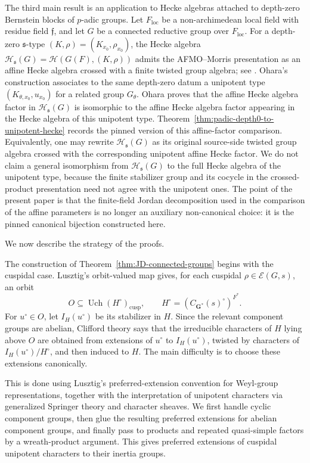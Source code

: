 \documentclass{amsart}
\theoremstyle{plain}
\numberwithin{equation}{section}
\theoremstyle{definition}
\newcommand{\cE}{\mathcal{E}}
\newcommand{\Uch}{\operatorname{Uch}}
\newcommand{\cusp}{\operatorname{cusp}}
\newcommand{\cH}{\mathcal{H}}
\newcommand{\bG}{\mathbf{G}}
\begin{document}
The third main result is an application to Hecke algebras attached to
depth-zero Bernstein blocks of \(p\)-adic groups.  Let \(F_{\mathrm{loc}}\) be
a non-archimedean local field with residue field \(\mathfrak f\), and let
\(G\) be a connected reductive group over \(F_{\mathrm{loc}}\).  For a depth-zero
\(\mathfrak s\)-type \((K,\rho)=(K_{x_0},\rho_{x_0})\), the Hecke algebra
\(\cH_{\mathfrak s}(G)=\mathcal H(G(F),(K,\rho))\) admits the AFMO--Morris
presentation as an affine Hecke algebra crossed with a finite twisted group
algebra; see \cite{AFMO24a}.  Ohara's construction \cite{ohara2025} associates
to the same depth-zero datum a unipotent type \((K_{\theta,x_0},u_{x_0})\) for a
related group \(G_\theta\).  Ohara proves that the affine Hecke algebra factor in
\(\cH_{\mathfrak s}(G)\) is isomorphic to the affine Hecke algebra factor
appearing in the Hecke algebra of this unipotent type.  Theorem~\ref{thm:padic-depth0-to-unipotent-hecke}
records the pinned version of this affine-factor comparison.  Equivalently, one
may rewrite \(\cH_{\mathfrak s}(G)\) as its original source-side twisted group
algebra crossed with the corresponding unipotent affine Hecke factor.  We do
not claim a general isomorphism from \(\cH_{\mathfrak s}(G)\) to the full Hecke
algebra of the unipotent type, because the finite stabilizer group and its
cocycle in the crossed-product presentation need not agree with the unipotent
ones.  The point of the present paper is that the finite-field Jordan
decomposition used in the comparison of the affine parameters is no longer an
auxiliary non-canonical choice: it is the pinned canonical bijection constructed
here.

We now describe the strategy of the proofs.

The construction of Theorem~\ref{thm:JD-connected-groups} begins with the
cuspidal case.  Lusztig's orbit-valued map gives, for each cuspidal
\(\rho\in\cE(G,s)\), an orbit
\[
O\subseteq \Uch(H^\circ)_{\cusp},
\qquad H^\circ=(C_{\bG^*}(s)^\circ)^{F^*}.
\]
For \(u^\circ\in O\), let \(I_H(u^\circ)\) be its stabilizer in \(H\).  Since
the relevant component groups are abelian, Clifford theory says that the
irreducible characters of \(H\) lying above \(O\) are obtained from extensions
of \(u^\circ\) to \(I_H(u^\circ)\), twisted by characters of
\(I_H(u^\circ)/H^\circ\), and then induced to \(H\).  The main difficulty is
to choose these extensions canonically.

This is done using Lusztig's preferred-extension convention for Weyl-group
representations, together with the interpretation of unipotent characters via
generalized Springer theory and character sheaves.  We first handle cyclic
component groups, then glue the resulting preferred extensions for abelian
component groups, and finally pass to products and repeated quasi-simple
factors by a wreath-product argument.  This gives preferred extensions of
cuspidal unipotent characters to their inertia groups.
\end{document}
